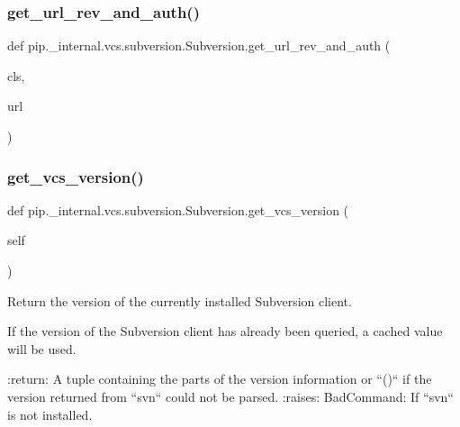 \subsubsection{\texorpdfstring{get\+\_\+url\+\_\+rev\+\_\+and\+\_\+auth()}{get\_url\_rev\_and\_auth()}}
{\footnotesize\ttfamily def pip.\+\_\+internal.\+vcs.\+subversion.\+Subversion.\+get\+\_\+url\+\_\+rev\+\_\+and\+\_\+auth (\begin{DoxyParamCaption}\item[{}]{cls,  }\item[{}]{url }\end{DoxyParamCaption})}

\mbox{\label{classpip_1_1__internal_1_1vcs_1_1subversion_1_1Subversion_a07d700bdb9e85e2709ecedc54344a0b8}} 
\subsubsection{\texorpdfstring{get\+\_\+vcs\+\_\+version()}{get\_vcs\_version()}}
{\footnotesize\ttfamily def pip.\+\_\+internal.\+vcs.\+subversion.\+Subversion.\+get\+\_\+vcs\+\_\+version (\begin{DoxyParamCaption}\item[{}]{self }\end{DoxyParamCaption})}

\begin{DoxyVerb}Return the version of the currently installed Subversion client.

If the version of the Subversion client has already been queried,
a cached value will be used.

:return: A tuple containing the parts of the version information or
    ``()`` if the version returned from ``svn`` could not be parsed.
:raises: BadCommand: If ``svn`` is not installed.
\end{DoxyVerb}
 \mbox{\label{classpip_1_1__internal_1_1vcs_1_1subversion_1_1Subversion_a6a4f6aaa4a5bf9fc2de0a550cbd2d320}} 
